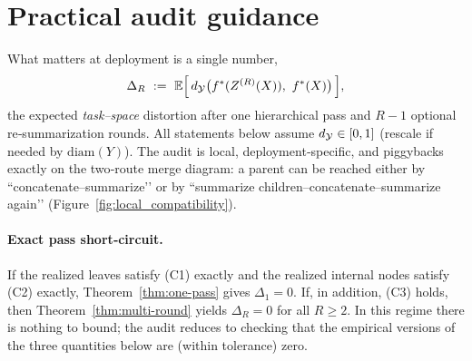 \section{Practical audit guidance}\label{app:practical_audit}

What matters at deployment is a single number,
\[
\Delta_R\ :=\ \E\Big[\,\metric\big(\fstar(Z^{(R)}(X)),\ \fstar(X)\big)\,\Big],
\]
the expected \emph{task–space} distortion after one hierarchical pass and $R-1$ optional
re‑summarization rounds. All statements below assume $d_{\mathcal{Y}}\in[0,1]$ (rescale if needed by
$\mathrm{diam}(Y)$). The audit is local, deployment‑specific, and piggybacks exactly on the two‑route
merge diagram: a parent can be reached either by “concatenate–summarize’’ or by “summarize
children–concatenate–summarize again’’ (Figure~\ref{fig:local_compatibility}).%

\paragraph{Exact pass short‑circuit.}
If the realized leaves satisfy \textnormal{(C1)} exactly and the realized internal nodes satisfy
\textnormal{(C2)} exactly, Theorem~\ref{thm:one-pass} gives $\Delta_1=0$. If, in addition, \textnormal{(C3)}
holds, then Theorem~\ref{thm:multi-round} yields $\Delta_R=0$ for all $R\ge2$. In this regime there is
nothing to bound; the audit reduces to checking that the empirical versions of the three quantities
below are (within tolerance) zero.

